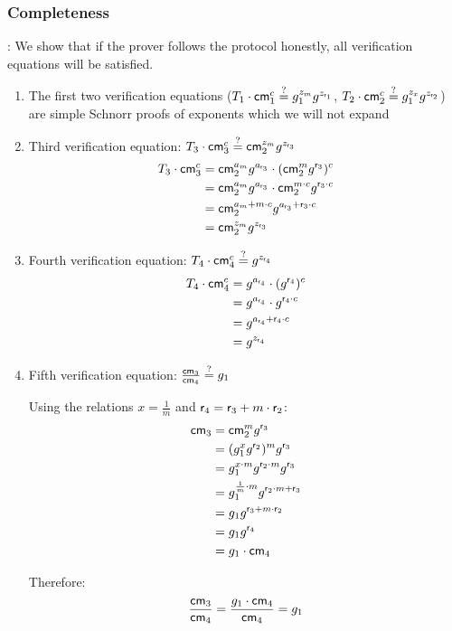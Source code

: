 


\subsubsection*{Completeness}:
We show that if the prover follows the protocol honestly, all verification equations will be satisfied.

\begin{enumerate}
    \item The first two verification equations ($T_1 \cdot \mathsf{cm}_1^c \stackrel{?}{=} g_1^{z_m} g^{z_{\mathsf{r}_1}}$, $T_2 \cdot \mathsf{cm}_2^c \stackrel{?}{=} g_1^{z_x} g^{z_{\mathsf{r}_2}}$) are simple Schnorr proofs of exponents which we will not expand 
        
    \item Third verification equation: $T_3 \cdot \mathsf{cm}_3^c \stackrel{?}{=} \mathsf{cm}_2^{z_m} g^{z_{\mathsf{r}_3}}$
    \begin{align*}
        T_3 \cdot \mathsf{cm}_3^c &= \mathsf{cm}_2^{a_m} g^{a_{\mathsf{r}_3}} \cdot (\mathsf{cm}_2^m g^{\mathsf{r}_3})^c \\
        &= \mathsf{cm}_2^{a_m} g^{a_{\mathsf{r}_3}} \cdot \mathsf{cm}_2^{m \cdot c} g^{\mathsf{r}_3 \cdot c} \\
        &= \mathsf{cm}_2^{a_m + m \cdot c} g^{a_{\mathsf{r}_3} + \mathsf{r}_3 \cdot c} \\
        &= \mathsf{cm}_2^{z_m} g^{z_{\mathsf{r}_3}}
    \end{align*}
    
    \item Fourth verification equation: $T_4 \cdot \mathsf{cm}_4^c \stackrel{?}{=} g^{z_{\mathsf{r}_4}}$
    \begin{align*}
        T_4 \cdot \mathsf{cm}_4^c &= g^{a_{\mathsf{r}_4}} \cdot (g^{\mathsf{r}_4})^c \\
        &= g^{a_{\mathsf{r}_4}} \cdot g^{\mathsf{r}_4 \cdot c} \\
        &= g^{a_{\mathsf{r}_4} + \mathsf{r}_4 \cdot c} \\
        &= g^{z_{\mathsf{r}_4}}
    \end{align*}
    
    \item Fifth verification equation: $\frac{\mathsf{cm}_3}{\mathsf{cm}_4} \stackrel{?}{=} g_1$
    
    Using the relations $x = \frac{1}{m}$ and $\mathsf{r}_4 = \mathsf{r}_3 + m \cdot \mathsf{r}_2$:
    \begin{align*}
        \mathsf{cm}_3 &= \mathsf{cm}_2^m g^{\mathsf{r}_3} \\
        &= (g_1^x g^{\mathsf{r}_2})^m g^{\mathsf{r}_3} \\
        &= g_1^{x \cdot m} g^{\mathsf{r}_2 \cdot m} g^{\mathsf{r}_3} \\
        &= g_1^{\frac{1}{m} \cdot m} g^{\mathsf{r}_2 \cdot m + \mathsf{r}_3} \\
        &= g_1 g^{\mathsf{r}_3 + m \cdot \mathsf{r}_2} \\
        &= g_1 g^{\mathsf{r}_4} \\
        &= g_1 \cdot \mathsf{cm}_4
    \end{align*}
    
    Therefore:
    \begin{align*}
        \frac{\mathsf{cm}_3}{\mathsf{cm}_4} = \frac{g_1 \cdot \mathsf{cm}_4}{\mathsf{cm}_4} = g_1
    \end{align*}
\end{enumerate}

